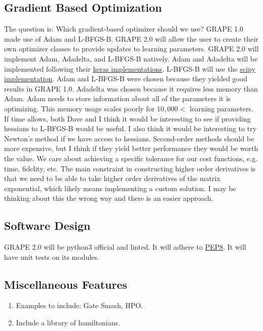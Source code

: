 \documentclass[letterpaper, 12pt]{article}
\begin{document}
\subsection{Gradient Based Optimization}
The question is: Which gradient-based optimizer should we use? GRAPE 1.0 made use of Adam and L-BFGS-B. GRAPE 2.0 will allow the user to create their own optimizer classes to provide updates to learning parameters. GRAPE 2.0 will implement Adam, Adadelta, and L-BFGS-B natively. Adam and Adadelta will be implemented following their \href{https://github.com/keras-team/keras/blob/master/keras/optimizers.py}{keras implementations}. L-BFGS-B will use the \href{https://docs.scipy.org/doc/scipy/reference/optimize.minimize-lbfgsb.html}{scipy implementation}. Adam and L-BFGS-B were chosen because they yielded good results in GRAPE 1.0. Adadelta was chosen because it requires less memory than Adam. Adam needs to store information about all of the parameters it is optimizing. This memory usage scales poorly for $10,000 <$ learning parameters. If time allows, both Dave and I think it would be interesting to see if providing hessians to L-BFGS-B would be useful. I also think it would be interesting to try Newton's method if we have access to hessians. Second-order methods should be more expensive, but I think if they yield better performance they would be worth the value. We care about achieving a specific tolerance for our cost functions, e.g. time, fidelity, etc. The main constraint in constructing higher order derivatives is that we need to be able to take higher order derivatives of the matrix exponential, which likely means implementing a custom solution. I may be thinking about this the wrong way and there is an easier approach.

\subsection{Software Design}
GRAPE 2.0 will be python3 official and linted. It will adhere to
\href{https://www.python.org/dev/peps/pep-0008/}{PEP8}. It will have unit tests on its modules.

\subsection{Miscellaneous Features}
\begin{enumerate}
\item Examples to include: Gate Smash, HPO.
\item Include a library of hamiltonians.
\end{enumerate}
\end{document}
